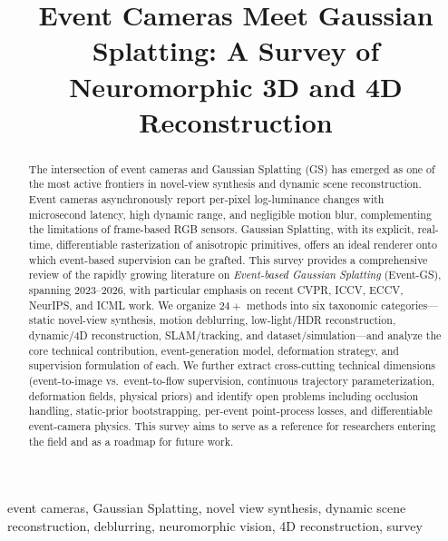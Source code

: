 \documentclass[10pt,conference]{IEEEtran}
\begin{document}
\title{Event Cameras Meet Gaussian Splatting: A Survey of Neuromorphic 3D and 4D Reconstruction}

\author{
}

\maketitle

\begin{abstract}
The intersection of event cameras and Gaussian Splatting (GS) has emerged as one of the most active frontiers in novel-view synthesis and dynamic scene reconstruction. Event cameras asynchronously report per-pixel log-luminance changes with microsecond latency, high dynamic range, and negligible motion blur, complementing the limitations of frame-based RGB sensors. Gaussian Splatting, with its explicit, real-time, differentiable rasterization of anisotropic primitives, offers an ideal renderer onto which event-based supervision can be grafted. This survey provides a comprehensive review of the rapidly growing literature on \emph{Event-based Gaussian Splatting} (Event-GS), spanning 2023--2026, with particular emphasis on recent CVPR, ICCV, ECCV, NeurIPS, and ICML work. We organize $24+$ methods into six taxonomic categories---static novel-view synthesis, motion deblurring, low-light/HDR reconstruction, dynamic/4D reconstruction, SLAM/tracking, and dataset/simulation---and analyze the core technical contribution, event-generation model, deformation strategy, and supervision formulation of each. We further extract cross-cutting technical dimensions (event-to-image vs.\ event-to-flow supervision, continuous trajectory parameterization, deformation fields, physical priors) and identify open problems including occlusion handling, static-prior bootstrapping, per-event point-process losses, and differentiable event-camera physics. This survey aims to serve as a reference for researchers entering the field and as a roadmap for future work.
\end{abstract}

\begin{IEEEkeywords}
event cameras, Gaussian Splatting, novel view synthesis, dynamic scene reconstruction, deblurring, neuromorphic vision, 4D reconstruction, survey
\end{IEEEkeywords}
















\end{document}
